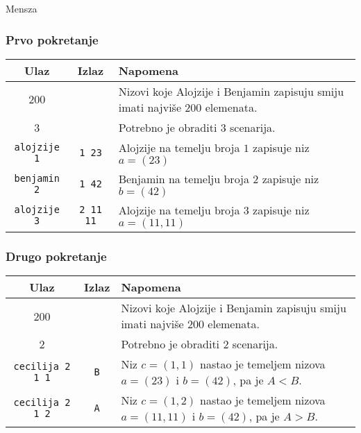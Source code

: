\begin{statement}[
  problempoints=100,
  timelimit=1 sekunda,
  memorylimit=512 MiB,
]{Mensza}
\subsubsection*{Prvo pokretanje}
{\renewcommand{\arraystretch}{1.4}
  \setlength{\tabcolsep}{6pt}
  \begin{tabular}{ccl}
    Ulaz & Izlaz & Napomena \\ \midrule
     200 & & Nizovi koje Alojzije i Benjamin zapisuju smiju imati najviše $200$ elemenata. \\
     3   & & Potrebno je obraditi $3$ scenarija. \\
    \texttt{\frenchspacing alojzije 1} & \texttt{1 23} & Alojzije na temelju broja $1$ zapisuje niz $a = (23)$ \\
    \texttt{\frenchspacing benjamin 2} & \texttt{1 42} & Benjamin na temelju broja $2$ zapisuje niz $b = (42)$ \\
    \texttt{\frenchspacing alojzije 3} & \texttt{2 11 11} & Alojzije na temelju broja $3$ zapisuje niz $a = (11, 11)$ \\
\end{tabular}}

\subsubsection*{Drugo pokretanje}
{\renewcommand{\arraystretch}{1.4}
  \setlength{\tabcolsep}{6pt}
  \begin{tabular}{ccl}
    Ulaz & Izlaz & Napomena \\ \midrule
     200 & & Nizovi koje Alojzije i Benjamin zapisuju smiju imati najviše $200$ elemenata. \\
     2   & & Potrebno je obraditi $2$ scenarija. \\
    \texttt{\frenchspacing cecilija 2 1 1} & \texttt{B} & Niz $c = (1, 1)$ nastao je temeljem nizova $a = (23)$ i $b = (42)$, pa je $A < B$. \\
    \texttt{\frenchspacing cecilija 2 1 2} & \texttt{A} & Niz $c = (1, 2)$ nastao je temeljem nizova $a = (11, 11)$ i $b = (42)$, pa je $A > B$.\\
\end{tabular}}


\end{statement}

